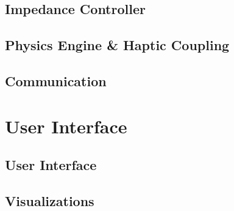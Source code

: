 \documentclass{article}
\begin{document}
%

		
	
	\subsection{Impedance Controller}

%


	\subsection{Physics Engine \& Haptic Coupling}
%


	\subsection{Communication} 
%


\section{User Interface}

	\subsection{User Interface}
%
%
	\subsection{Visualizations}
%
	
\end{document}
